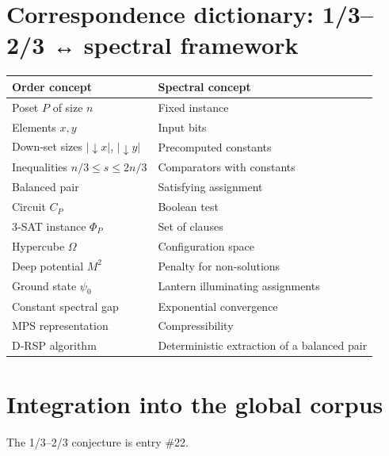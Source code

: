 \documentclass[11pt,a4paper]{article}
\begin{document}
\section{Correspondence dictionary: 1/3–2/3 ↔ spectral framework}

\begin{center}
\small
\begin{tabular}{@{}l|l@{}}
\toprule
\textbf{Order concept} & \textbf{Spectral concept} \\
\midrule
Poset $P$ of size $n$ & Fixed instance \\
Elements $x,y$ & Input bits \\
Down‑set sizes $|\downarrow x|$, $|\downarrow y|$ & Precomputed constants \\
Inequalities $n/3 \le s \le 2n/3$ & Comparators with constants \\
Balanced pair & Satisfying assignment \\
Circuit $C_P$ & Boolean test \\
3‑SAT instance $\Phi_P$ & Set of clauses \\
Hypercube $\Omega$ & Configuration space \\
Deep potential $M^2$ & Penalty for non‑solutions \\
Ground state $\psi_0$ & Lantern illuminating assignments \\
Constant spectral gap & Exponential convergence \\
MPS representation & Compressibility \\
D‑RSP algorithm & Deterministic extraction of a balanced pair \\
\bottomrule
\end{tabular}
\end{center}

\section{Integration into the global corpus}

The 1/3–2/3 conjecture is entry \#22.
\end{document}

